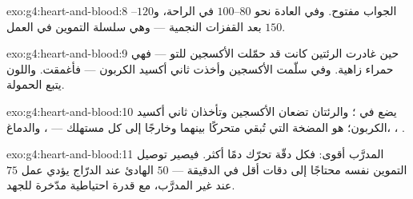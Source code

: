 \begin{solution}{exo:g4:heart-and-blood:8}
الجواب مفتوح. وفي العادة نحو $80$--$100$ في الراحة، و$120$--$150$
بعد القفزات النجمية --- وهي سلسلة التموين في العمل.
\end{solution}

\begin{solution}{exo:g4:heart-and-blood:9}
حين غادرت الرئتين كانت قد حمّلت الأكسجين للتو --- فهي حمراء زاهية.
وفي  سلّمت الأكسجين وأخذت ثاني أكسيد الكربون --- فأغمقت.
واللون يتبع الحمولة.
\end{solution}

\begin{solution}{exo:g4:heart-and-blood:10}
 يضع  في ؛ والرئتان تضعان الأكسجين
وتأخذان ثاني أكسيد الكربون؛  هو المضخة التي تُبقي 
متحركًا بينهما وخارجًا إلى كل مستهلك --- ، والدماغ،
، .
\end{solution}

\begin{solution}{exo:g4:heart-and-blood:11}
 المدرَّب  أقوى: فكل دقّة تحرّك دمًا أكثر. فيصير توصيل
التموين نفسه محتاجًا إلى دقات أقل في الدقيقة ---  $50$ الهادئ
عند الدرّاج يؤدي عمل  $75$ عند غير المدرَّب، مع قدرة احتياطية
مدّخرة للجهد.
\end{solution}
